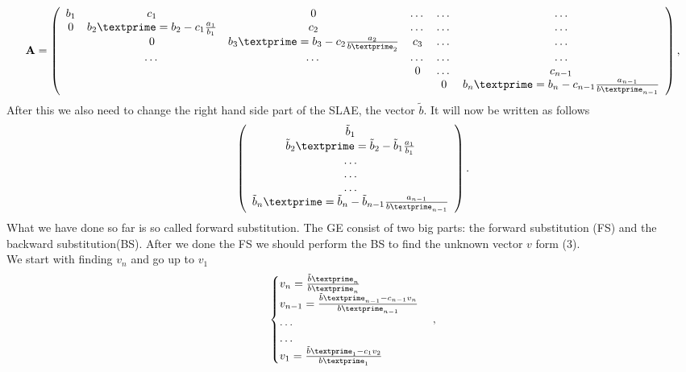 \documentclass[10pt]{article}
\begin{document}
\begin{equation}
    {\bf A} = \left(\begin{array}{cccccc}
                             b_1& c_1 & 0 &\dots   & \dots &\dots \\
                           0 & {b_2}\textprime=b_2-c_{1}\frac{a_1}{b_1} & c_2 &\dots &\dots &\dots \\
                           & 0 & {b_3}\textprime=b_3-c_{2}\frac{a_2}{{b}\textprime_{2}}  & c_3 & \dots & \dots \\
                           & \dots   & \dots &\dots   &\dots & \dots \\
                           &   &  &0  &\dots & c_{n-1} \\
                           &    &  &   &0 & {b_n}\textprime=b_{n}-c_{n-1}\frac{a_{n-1}}{{b}\textprime_{n-1}}  \\
                      \end{array} \right),
\end{equation}
After this we also need to change the right hand side part of the SLAE, the vector $ \tilde{b} $. It will now be written as follows
\begin{equation}
\left(\begin{array}{c}
                           \tilde{b}_1\\
                           {\tilde{b}_2}\textprime=\tilde{b}_2-\tilde{b}_1\frac{a_1}{b_1}\\
                           \dots \\
                           \dots \\
                          \dots \\
                           {\tilde{b}_n}\textprime=\tilde{b}_n - \tilde{b}_{n-1}\frac{a_{n-1}}{{b}\textprime_{n-1}} \\
                      \end{array} \right).
\end{equation}
What we have done so far is so called forward substitution. The GE consist of two big parts: the forward substitution (FS) and the backward substitution(BS). After we done the FS we should perform the BS to find the unknown vector $ v $ form (3). \\
We start with finding $ v_{n} $ and go up to $ v_{1} $
\begin{equation}
\begin{cases}
v_{n}=  \frac{{\tilde{b}\textprime_n}}{{b}\textprime_n}\\ 
v_{n-1}=  \frac{{\tilde{b}\textprime_{n-1}-c_{n-1}v_{n}}}{{b}\textprime_{n-1}}  \\ 
\dots   \\ 
\dots  \\ 
v_{1}= \frac{{\tilde{b}\textprime_{1}-c_{1}v_{2}}}{{b}\textprime_{1}} \\
\end{cases},
\end{equation}
\end{document}

